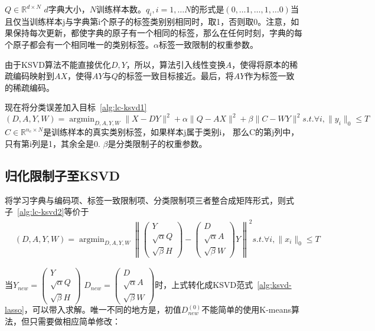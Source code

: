      $Q\in \mathbb{R}^{d \times N}$ $d$字典大小，$N$训练样本数。$q_i, i = 1, \dots N$的形式是$(0, \dots 1, \dots, 1, \dots 0)$当且仅当训练样本j与字典第i个原子的标签类别别相同时，取1，否则取0。注意，如果保持每次更新，都使字典的原子有一个相同的标签，那么在任何时刻，字典的每个原子都会有一个相同唯一的类别标签。$\alpha $标签一致限制的权重参数。

    由于KSVD算法不能直接优化$D, Y$，所以，算法引入线性变换$A$，使得将原本的稀疏编码映射到$AX$，使得$AY$与$Q$的标签一致目标接近。最后，将$AY$作为标签一致的稀疏编码。



    现在将分类误差加入目标~\ref{alg:lc-ksvd1}
    \begin{equation}
    \label{alg:lc-ksvd2}
    (D, A, Y, W) = \mathop{\arg \min} _{D, A, Y, W} \|X - DY\| ^ 2 + \alpha\|Q - AX\|^2 + \beta\|C - WY\|^2 s.t. \forall i, \|y_i\|_0 \le T
    \end{equation}
    $C\in \mathbb{R}^{n_c \times N}$是训练样本的真实类别标签，如果样本j属于类别i， 那么C的第j列中，只有第i列是1，其余全是0. $\beta$是分类限制子的权重参数。

    \subsection{归化限制子至KSVD}

    将学习字典与编码项、标签一致限制项、分类限制项三者整合成矩阵形式，则式子~\ref{alg:lc-ksvd2}等价于
    \begin{equation}
    \begin{split}
    & (D, A, Y, W) = \mathop{\arg\min}_{D, A, Y, W} \left\|\begin{pmatrix} Y \\ \sqrt{\alpha} Q \\ \sqrt{\beta}H\end{pmatrix} - \begin{pmatrix} D \\ \sqrt{\alpha} A \\ \sqrt{\beta}W\end{pmatrix} Y\right\| ^2 s.t. \forall i, \|x_i\|_0 \le T
    \end{split}
    \end{equation}

    当$Y_{new} = \begin{pmatrix} Y \\ \sqrt{\alpha} Q \\ \sqrt{\beta}H\end{pmatrix}$ $D_{new} = \begin{pmatrix} D \\ \sqrt{\alpha} A \\ \sqrt{\beta}W\end{pmatrix}$时，上式转化成KSVD范式~\ref{alg:ksvd-lasso}，可以带入求解。唯一不同的地方是，初值$D_{new}^{(0)}$不能简单的使用K-means算法，但只需要做相应简单修改：

